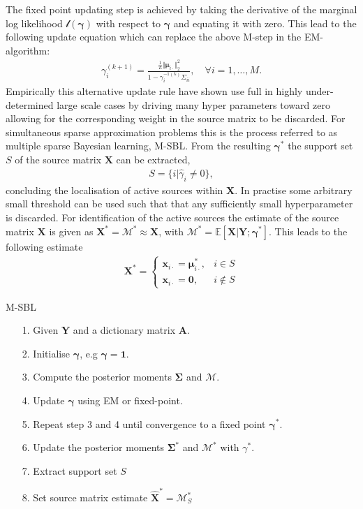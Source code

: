 The fixed point updating step is achieved by taking the derivative of the marginal log likelihood $\mathcal{l}(\boldsymbol{\gamma})$ with respect to $\boldsymbol{\gamma}$ and equating it with zero. 
This lead to the following update equation which can replace the above M-step in the EM-algorithm:
\begin{align*}
\gamma_i^{(k+1)} = \frac{\frac{1}{L} \Vert \boldsymbol{\mu}_{i \cdot} \Vert_2^2}{1 - \gamma_i^{-1 (k)} \Sigma_{ii}}, \quad \forall i = 1, \dots, M.
\end{align*}
Empirically this alternative update rule have shown use full in highly under-determined large scale cases by driving many hyper parameters toward zero allowing for the corresponding weight in the source matrix to be discarded. 
For simultaneous sparse approximation problems this is the process referred to as multiple sparse Bayesian learning, M-SBL.
From the resulting $\boldsymbol{\gamma}^\ast$ the support set $S$ of the source matrix $\textbf{X}$ can be extracted, 
\begin{align*}
S = \{ i \vert \hat{\gamma}_i \neq 0 \},
\end{align*}
concluding the localisation of active sources within $\textbf{X}$. 
In practise some arbitrary small threshold can be used such that that any sufficiently small hyperparameter is discarded.
For identification of the active sources the estimate of the source matrix $\textbf{X}$ is given as $\textbf{X}^\ast=\mathcal{M}^\ast \approx \textbf{X}$, with $\mathcal{M}^\ast = \mathbb{E}[\textbf{X}\vert \textbf{Y};\boldsymbol{\gamma}^\ast]$. 
This leads to the following estimate  
\begin{align*}
\mathbf{X}^\ast = 
\begin{cases}
\mathbf{x}_{i\cdot} = \boldsymbol{\mu}_{i \cdot}^\ast, & i \in S \\
\mathbf{x}_{i\cdot} = \mathbf{0}, & i \not \in S
\end{cases}
\end{align*}

\begin{algorithm}[H]
\caption{M-SBL}
\begin{itemize}
\item[1.] Given $\mathbf{Y}$ and a dictionary matrix $\mathbf{A}$.
\item[2.] Initialise $\boldsymbol{\gamma}$, e.g $\boldsymbol{\gamma} = \mathbf{1}$.
\item[3.] Compute the posterior moments $\boldsymbol{\Sigma}$ and $\mathcal{M}$.
\item[4.] Update $\boldsymbol{\gamma}$ using EM or fixed-point.
\item[5.] Repeat step 3 and 4 until convergence to a fixed point $\boldsymbol{\gamma}^\ast$.
\item[6.] Update the posterior moments $\boldsymbol{\Sigma}^\ast$ and $\mathcal{M}^\ast$ with $\gamma^\ast$.
\item[7.] Extract support set $S$
\item[8.] Set source matrix estimate $\hat{\mathbf{X}}^\ast = \mathcal{M}^\ast_S$
\end{itemize}
\end{algorithm}

